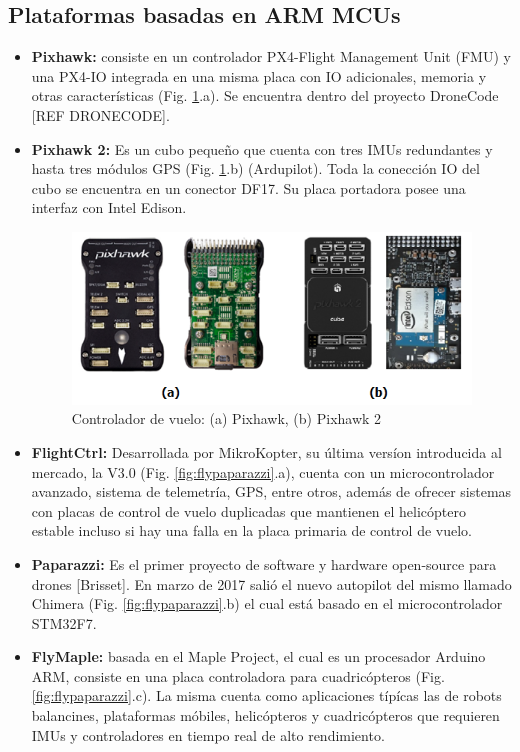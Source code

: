 \subsection{Plataformas basadas en ARM MCUs}
\begin{itemize}
    \item \textbf{Pixhawk:} consiste en un controlador PX4-Flight Management Unit (FMU) y una PX4-IO integrada en una misma placa con IO adicionales, memoria y otras características (Fig. \ref{fig:pixhawks}.a). Se encuentra dentro del proyecto DroneCode [REF DRONECODE].
    \item \textbf{Pixhawk 2:} Es un cubo pequeño que cuenta con tres IMUs redundantes y hasta tres módulos GPS (Fig. \ref{fig:pixhawks}.b) (Ardupilot). Toda la conección IO del cubo se encuentra en un conector DF17. Su placa portadora posee una interfaz con Intel Edison.
    
    \begin{figure}[!ht]
        \centering
        \includegraphics[width=.95\textwidth]{Img/pixhawks}
        \caption{Controlador de vuelo: (a) Pixhawk, (b) Pixhawk 2}
        \label{fig:pixhawks}
    \end{figure}
    
    \item \textbf{FlightCtrl:} Desarrollada por MikroKopter, su última versíon introducida al mercado, la V3.0 (Fig. \ref{fig:flypaparazzi}.a), cuenta con un microcontrolador avanzado, sistema de telemetría, GPS, entre otros, además de ofrecer sistemas con placas de control de vuelo duplicadas que mantienen el helicóptero estable incluso si hay una falla en la placa primaria de control de vuelo.
    \item \textbf{Paparazzi:} Es el primer proyecto de software y hardware open-source para drones [Brisset]. En marzo de 2017 salió el nuevo autopilot del mismo llamado Chimera (Fig. \ref{fig:flypaparazzi}.b) el cual está basado en el microcontrolador STM32F7.
    \item \textbf{FlyMaple:} basada en el Maple Project, el cual es un procesador Arduino ARM, consiste en una placa controladora para cuadricópteros (Fig. \ref{fig:flypaparazzi}.c). La misma cuenta como aplicaciones típícas las de robots balancines, plataformas móbiles, helicópteros y cuadricópteros que requieren IMUs y controladores en tiempo real de alto rendimiento.
    

\end{itemize}
